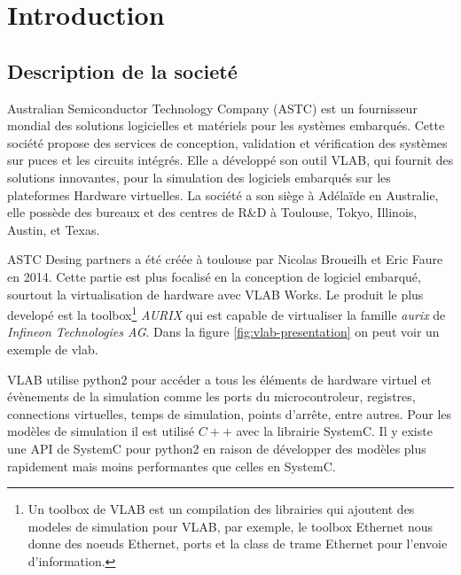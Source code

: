 \section{Introduction}

\subsection{Description de la societ\'e}
Australian Semiconductor Technology Company (ASTC) est un fournisseur mondial des solutions logicielles et matériels pour les systèmes embarqués. Cette soci\'et\'e propose des services de conception, validation et vérification des systèmes sur puces et les circuits intégrés. Elle a développé son outil VLAB, qui fournit des solutions innovantes, pour la simulation des logiciels embarqués sur les plateformes Hardware virtuelles. La société a son siège à Adélaïde en Australie, elle possède des bureaux et des centres de R\&D à Toulouse, Tokyo, Illinois, Austin, et Texas. 

ASTC Desing partners a été créée \`a toulouse par Nicolas Broueilh et Eric Faure en 2014. Cette partie est plus focalis\'e en la conception de logiciel embarqu\'e, sourtout la virtualisation de hardware avec VLAB Works. Le produit le plus develop\'e est la toolbox\footnote{Un toolbox de VLAB est un compilation des librairies qui ajoutent des modeles de simulation pour VLAB, par exemple, le toolbox Ethernet nous donne des noeuds Ethernet, ports et la class de trame Ethernet pour l'envoie d'information.} \textit{AURIX} qui est capable de virtualiser la famille \textit{aurix} de \textit{Infineon Technologies AG}. Dans la figure \ref{fig:vlab-presentation} on peut voir un exemple de vlab.

VLAB utilise python2 pour accéder a tous les éléments de hardware virtuel et évènements de la simulation comme les ports du microcontroleur, registres, connections virtuelles, temps de simulation, points d'arrête, entre autres. Pour les modèles de simulation il est utilis\'e $C++$ avec la librairie SystemC\cite{sysc}. Il y existe une API de SystemC pour python2 en raison de développer des mod\`eles plus rapidement mais moins performantes que celles en SystemC. %


